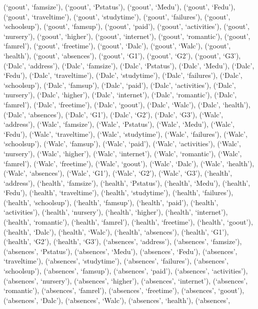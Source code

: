 \documentclass[
]{article}
\begin{document}
(`goout', `famsize'), (`goout', `Pstatus'), (`goout', `Medu'), (`goout',
`Fedu'), (`goout', `traveltime'), (`goout', `studytime'), (`goout',
`failures'), (`goout', `schoolsup'), (`goout', `famsup'), (`goout',
`paid'), (`goout', `activities'), (`goout', `nursery'), (`goout',
`higher'), (`goout', `internet'), (`goout', `romantic'), (`goout',
`famrel'), (`goout', `freetime'), (`goout', `Dalc'), (`goout', `Walc'),
(`goout', `health'), (`goout', `absences'), (`goout', `G1'), (`goout',
`G2'), (`goout', `G3'), (`Dalc', `address'), (`Dalc', `famsize'),
(`Dalc', `Pstatus'), (`Dalc', `Medu'), (`Dalc', `Fedu'), (`Dalc',
`traveltime'), (`Dalc', `studytime'), (`Dalc', `failures'), (`Dalc',
`schoolsup'), (`Dalc', `famsup'), (`Dalc', `paid'), (`Dalc',
`activities'), (`Dalc', `nursery'), (`Dalc', `higher'), (`Dalc',
`internet'), (`Dalc', `romantic'), (`Dalc', `famrel'), (`Dalc',
`freetime'), (`Dalc', `goout'), (`Dalc', `Walc'), (`Dalc', `health'),
(`Dalc', `absences'), (`Dalc', `G1'), (`Dalc', `G2'), (`Dalc', `G3'),
(`Walc', `address'), (`Walc', `famsize'), (`Walc', `Pstatus'), (`Walc',
`Medu'), (`Walc', `Fedu'), (`Walc', `traveltime'), (`Walc',
`studytime'), (`Walc', `failures'), (`Walc', `schoolsup'), (`Walc',
`famsup'), (`Walc', `paid'), (`Walc', `activities'), (`Walc',
`nursery'), (`Walc', `higher'), (`Walc', `internet'), (`Walc',
`romantic'), (`Walc', `famrel'), (`Walc', `freetime'), (`Walc',
`goout'), (`Walc', `Dalc'), (`Walc', `health'), (`Walc', `absences'),
(`Walc', `G1'), (`Walc', `G2'), (`Walc', `G3'), (`health', `address'),
(`health', `famsize'), (`health', `Pstatus'), (`health', `Medu'),
(`health', `Fedu'), (`health', `traveltime'), (`health', `studytime'),
(`health', `failures'), (`health', `schoolsup'), (`health', `famsup'),
(`health', `paid'), (`health', `activities'), (`health', `nursery'),
(`health', `higher'), (`health', `internet'), (`health', `romantic'),
(`health', `famrel'), (`health', `freetime'), (`health', `goout'),
(`health', `Dalc'), (`health', `Walc'), (`health', `absences'),
(`health', `G1'), (`health', `G2'), (`health', `G3'), (`absences',
`address'), (`absences', `famsize'), (`absences', `Pstatus'),
(`absences', `Medu'), (`absences', `Fedu'), (`absences', `traveltime'),
(`absences', `studytime'), (`absences', `failures'), (`absences',
`schoolsup'), (`absences', `famsup'), (`absences', `paid'), (`absences',
`activities'), (`absences', `nursery'), (`absences', `higher'),
(`absences', `internet'), (`absences', `romantic'), (`absences',
`famrel'), (`absences', `freetime'), (`absences', `goout'), (`absences',
`Dalc'), (`absences', `Walc'), (`absences', `health'), (`absences',
\end{document}
